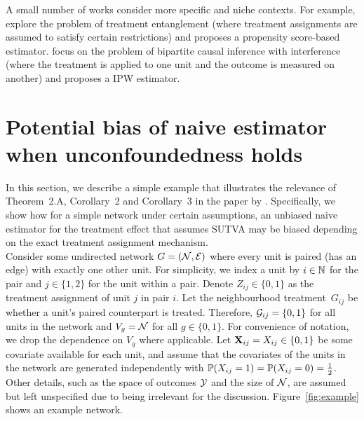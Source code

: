 \documentclass[10pt]{article}
\begin{document}
A small number of works consider more specific and niche contexts. For example, \textcite{Toulis:2018} explore the problem of treatment entanglement (where treatment assignments are assumed to satisfy certain restrictions) and proposes a propensity score-based estimator. \textcite{Zigler:2021} focus on the problem of bipartite causal inference with interference (where the treatment is applied to one unit and the outcome is measured on another) and proposes a IPW estimator.


\section{Potential bias of naive estimator when unconfoundedness holds}

In this section, we describe a simple example that illustrates the relevance of Theorem~2.A, Corollary~2 and Corollary~3 in the paper by \textcite{Forastiere:2021}. Specifically, we show how for a simple network under certain assumptions, an unbiased naive estimator for the treatment effect that assumes SUTVA may be biased depending on the exact treatment assignment mechanism.
\\

Consider some undirected network $G=(\calN,\calE)$ where every unit is paired (has an edge) with exactly one other unit. For simplicity, we index a unit by $i\in\bbN$ for the pair and $j\in\{1,2\}$ for the unit within a pair. Denote $Z_{ij}\in\{0,1\}$ as the treatment assignment of unit $j$ in pair $i$. Let the neighbourhood treatment~$G_{ij}$ be whether a unit's paired counterpart is treated. Therefore, $\calG_{ij}=\{0,1\}$ for all units in the network and $V_g=\calN$ for all $g\in\{0,1\}$. For convenience of notation, we drop the dependence on $V_g$ where applicable. Let $\bfX_{ij}=X_{ij}\in\{0,1\}$ be some covariate available for each unit, and assume that the covariates of the units in the network are generated independently with $\P(X_{ij}=1)=\P(X_{ij}=0)=\frac{1}{2}$. Other details, such as the space of outcomes $\calY$ and the size of $\calN$, are assumed but left unspecified due to being irrelevant for the discussion. Figure~\ref{fig:example} shows an example network.
\\
\end{document}
